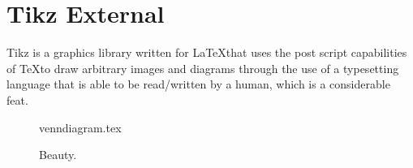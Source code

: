 \documentclass[float=false, crop=false, class=report, a4, 12pt, onesided]{standalone}
\begin{document}
\chapter{Tikz External}\label{cha:tikz}

Tikz is a graphics library written for \LaTeX that uses the post script
capabilities of \TeX to draw arbitrary images and diagrams through the use of a
typesetting language that is able to be read/written by a human, which is a
considerable feat.

\begin{figure}[ht]
    \center
    {venndiagram.tex}
    \caption{Beauty.}
\end{figure}
\end{document}
